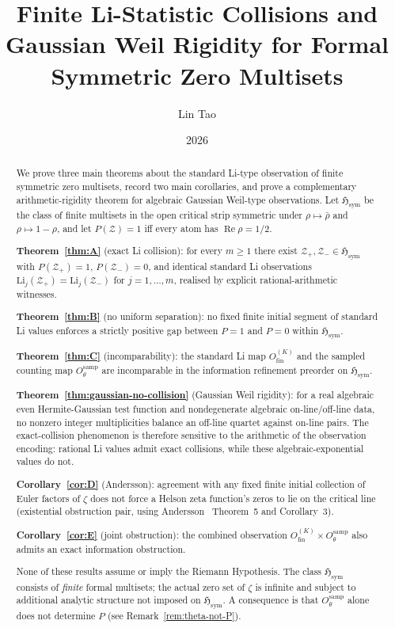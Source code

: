 \documentclass[12pt]{amsart}
\theoremstyle{definition}
\theoremstyle{remark}
\theoremstyle{plain}
\newcommand{\Hsym}{\mathfrak{H}_{\mathrm{sym}}}
\newcommand{\Li}{\mathrm{Li}}
\newcommand{\Ofinite}{O_{\mathrm{fin}}}
\newcommand{\Otheta}{O_{\theta}^{\mathrm{samp}}}
\newcommand{\re}{\operatorname{Re}}
\begin{document}
\title[Finite Collisions and Gaussian Rigidity]{Finite
  Li-Statistic Collisions and Gaussian Weil Rigidity for Formal
  Symmetric Zero Multisets}

\author{Lin Tao}
\date{2026}

\begin{abstract}
We prove three main theorems about the standard Li-type observation of finite
symmetric zero multisets, record two main corollaries, and prove a
complementary arithmetic-rigidity theorem for algebraic Gaussian Weil-type
observations.
Let $\Hsym$ be the class of finite multisets in the open critical strip
symmetric under $\rho\mapsto\bar\rho$ and $\rho\mapsto 1-\rho$, and let
$P(\mathcal{Z})=1$ iff every atom has $\re\rho=1/2$.

\textbf{Theorem~\ref{thm:A}} (exact Li collision): for every $m\geq 1$ there exist
$\mathcal{Z}_+,\mathcal{Z}_-\in\Hsym$ with $P(\mathcal{Z}_+)=1$,
$P(\mathcal{Z}_-)=0$, and identical standard Li observations
$\Li_j(\mathcal{Z}_+)=\Li_j(\mathcal{Z}_-)$ for $j=1,\ldots,m$,
realised by explicit rational-arithmetic witnesses.

\textbf{Theorem~\ref{thm:B}} (no uniform separation): no fixed finite initial
segment of standard Li values enforces a strictly positive gap between $P=1$ and $P=0$
within $\Hsym$.

\textbf{Theorem~\ref{thm:C}} (incomparability): the standard Li map
$\Ofinite^{(K)}$ and the sampled counting map $\Otheta$ are
incomparable in the information refinement preorder on $\Hsym$.

\textbf{Theorem~\ref{thm:gaussian-no-collision}} (Gaussian Weil rigidity):
for a real algebraic even Hermite-Gaussian test function and nondegenerate
algebraic on-line/off-line data, no nonzero integer multiplicities balance an
off-line quartet against on-line pairs.  The exact-collision phenomenon is
therefore sensitive to the arithmetic of the observation encoding: rational
Li values admit exact collisions, while these algebraic-exponential values do
not.

\textbf{Corollary~\ref{cor:D}} (Andersson): agreement with any fixed finite initial
collection of Euler factors of $\zeta$ does not force
a Helson zeta function's zeros to lie on the critical line
(existential obstruction pair, using Andersson~\cite{Andersson2024}
Theorem~5 and Corollary~3).

\textbf{Corollary~\ref{cor:E}} (joint obstruction): the combined observation
$\Ofinite^{(K)}\times\Otheta$ also admits an exact information obstruction.

None of these results assume or imply the Riemann Hypothesis.
The class $\Hsym$ consists of \emph{finite} formal multisets;
the actual zero set of $\zeta$ is infinite and subject to additional
analytic structure not imposed on $\Hsym$.
A consequence is that $\Otheta$ alone does not determine $P$
(see Remark~\ref{rem:theta-not-P}).
\end{abstract}
\end{document}
